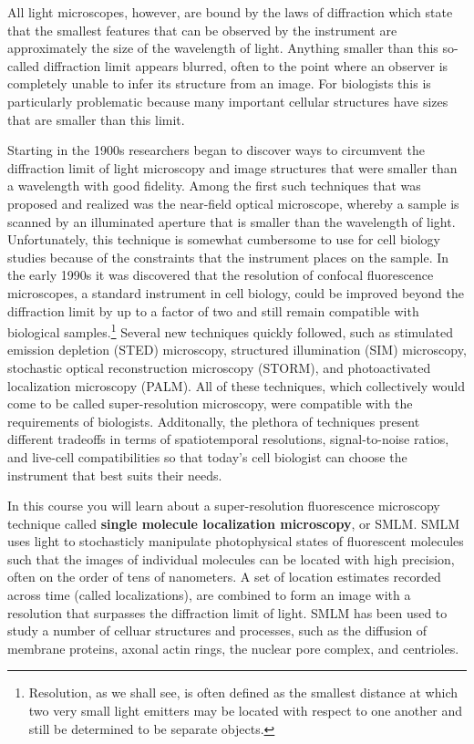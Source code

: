 \documentclass[10pt,a4paper,oneside]{book}
\begin{document}
All light microscopes, however, are bound by the laws of diffraction which state that the smallest features that can be observed by the instrument are approximately the size of the wavelength of light. Anything smaller than this so-called diffraction limit appears blurred, often to the point where an observer is completely unable to infer its structure from an image. For biologists this is particularly problematic because many important cellular structures have sizes that are smaller than this limit.

Starting in the 1900s researchers began to discover ways to circumvent the diffraction limit of light microscopy and image structures that were smaller than a wavelength with good fidelity. Among the first such techniques that was proposed and realized was the near-field optical microscope, whereby a sample is scanned by an illuminated aperture that is smaller than the wavelength of light. Unfortunately, this technique is somewhat cumbersome to use for cell biology studies because of the constraints that the instrument places on the sample. In the early 1990s it was discovered that the resolution of confocal fluorescence microscopes, a standard instrument in cell biology, could be improved beyond the diffraction limit by up to a factor of two and still remain compatible with biological samples.\footnote{Resolution, as we shall see, is often defined as the smallest distance at which two very small light emitters may be located with respect to one another and still be determined to be separate objects.} Several new techniques quickly followed, such as stimulated emission depletion (STED) microscopy\cite{hell-opticsletters-1994}, structured illumination (SIM) microscopy\cite{gustafsson-jmicroscopy-2000}, stochastic optical reconstruction microscopy (STORM)\cite{rust-naturemethods-2006}, and photoactivated localization microscopy (PALM)\cite{betzig-science-2006, hess-biophysicaljournal-2006}. All of these techniques, which collectively would come to be called super-resolution microscopy, were compatible with the requirements of biologists. Additonally, the plethora of techniques present different tradeoffs in terms of spatiotemporal resolutions, signal-to-noise ratios, and live-cell compatibilities so that today's cell biologist can choose the instrument that best suits their needs.

In this course you will learn about a super-resolution fluorescence microscopy technique called \textbf{single molecule localization microscopy}, or SMLM. SMLM uses light to stochasticly manipulate photophysical states of fluorescent molecules such that the images of individual molecules can be located with high precision, often on the order of tens of nanometers. A set of location estimates recorded across time (called localizations), are combined to form an image with a resolution that surpasses the diffraction limit of light. SMLM has been used to study a number of celluar structures and processes, such as the diffusion of membrane proteins, axonal actin rings, the nuclear pore complex, and centrioles.
\end{document}
